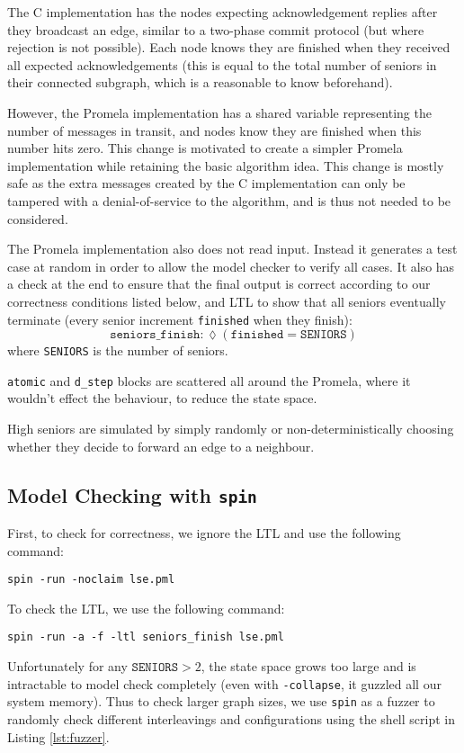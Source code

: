 \documentclass[a4paper]{scrartcl}
\newcommand{\eventually}{\lozenge}
\begin{document}
The C implementation has the nodes expecting acknowledgement replies after they broadcast an edge, similar to a two-phase commit protocol (but where rejection is not possible). Each node knows they are finished when they received all expected acknowledgements (this is equal to the total number of seniors in their connected subgraph, which is a reasonable to know beforehand).

However, the Promela implementation has a shared variable representing the number of messages in transit, and nodes know they are finished when this number hits zero. This change is motivated to create a simpler Promela implementation while retaining the basic algorithm idea. This change is mostly safe as the extra messages created by the C implementation can only be tampered with a denial-of-service to the algorithm, and is thus not needed to be considered.

The Promela implementation also does not read input. Instead it generates a test case at random in order to allow the model checker to verify all cases. It also has a check at the end to ensure that the final output is correct according to our correctness conditions listed below, and LTL to show that all seniors eventually terminate (every senior increment \texttt{finished} when they finish):
\[\texttt{seniors\_finish}: \eventually(\texttt{finished} = \texttt{SENIORS})\]
where \texttt{SENIORS} is the number of seniors.

\texttt{atomic} and \texttt{d\_step} blocks are scattered all around the Promela, where it wouldn't effect the behaviour, to reduce the state space.

High seniors are simulated by simply randomly or non-deterministically choosing whether they decide to forward an edge to a neighbour.

\subsection{Model Checking with \texttt{spin}}
First, to check for correctness, we ignore the LTL and use the following command:
\begin{lstlisting}
spin -run -noclaim lse.pml
\end{lstlisting}

To check the LTL, we use the following command:
\begin{lstlisting}
spin -run -a -f -ltl seniors_finish lse.pml
\end{lstlisting}

Unfortunately for any \(\texttt{SENIORS} > 2\), the state space grows too large and is intractable to model check completely (even with \texttt{-collapse}, it guzzled all our system memory). Thus to check larger graph sizes, we use \texttt{spin} as a fuzzer to randomly check different interleavings and configurations using the shell script in Listing \ref{lst:fuzzer}.
\end{document}
